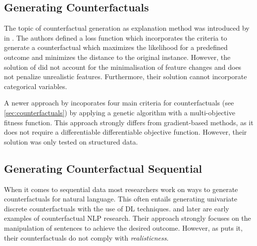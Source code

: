 \documentclass[./../../paper.tex]{subfiles}
\begin{document}
\subsection{Generating Counterfactuals}
The topic of counterfactual generation as explanation method was introduced by \citeauthor{wachter_CounterfactualExplanationsOpening_2017} in \citeyear{wachter_CounterfactualExplanationsOpening_2017}\autocite{wachter_CounterfactualExplanationsOpening_2017}. The authors defined a loss function which incorporates the criteria to generate a counterfactual which maximizes the likelihood for a predefined outcome and minimizes the distance to the original instance. However, the solution of \citeauthor{wachter_CounterfactualExplanationsOpening_2017} did not account for the minimalisation of feature changes and does not penalize unrealistic features. Furthermore, their solution cannot incorporate categorical variables.

A newer approach by \citeauthor{dandl_MultiObjectiveCounterfactualExplanations_2020} incoporates four main criteria for counterfactuals (see \autoref{sec:counterfactuals}) by applying a genetic algorithm with a multi-objective fitness function\autocite{dandl_MultiObjectiveCounterfactualExplanations_2020}. This approach strongly differs from gradient-based methods, as it does not require a differentiable differentiable objective function. However, their solution was only tested on structured data.

\subsection{Generating Counterfactual Sequential}
When it comes to sequential data most researchers work on ways to generate counterfactuals for natural language. This often entails generating univariate discrete counterfactuals with the use of \gls{DL} techniques. \citeauthor{martens_ExplainingDatadrivenDocument_2014} and later \citeauthor{krause_InteractingPredictionsVisual_2016} are early examples of counterfactual NLP research\autocites{martens_ExplainingDatadrivenDocument_2014,krause_InteractingPredictionsVisual_2016}. Their approach strongly focuses on the manipulation of sentences to achieve the desired outcome. However, as \citeauthor{robeer_GeneratingRealisticNatural_2021} puts it, their counterfactuals do not comply with \emph{realisticness}\autocite{robeer_GeneratingRealisticNatural_2021}.
\end{document}

